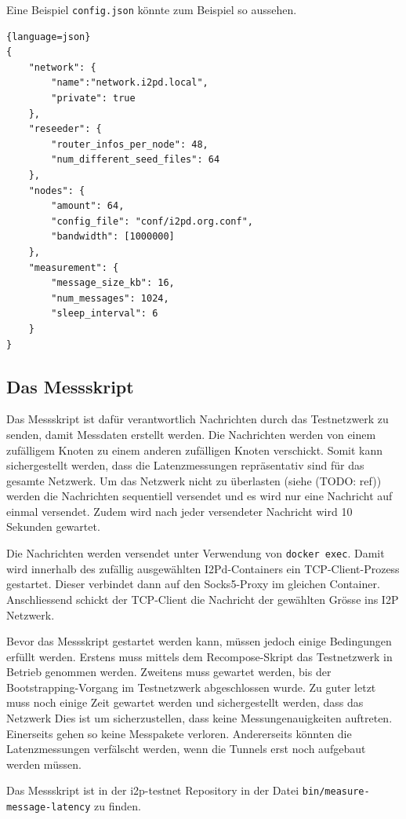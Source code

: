Eine Beispiel \lstinline|config.json| könnte zum Beispiel so aussehen.

\begin{lstlisting}{language=json}
{
    "network": {
        "name":"network.i2pd.local",
        "private": true
    },
    "reseeder": {
        "router_infos_per_node": 48,
        "num_different_seed_files": 64
    },
    "nodes": {
        "amount": 64,
        "config_file": "conf/i2pd.org.conf",
        "bandwidth": [1000000]
    },
    "measurement": {
        "message_size_kb": 16,
        "num_messages": 1024,
        "sleep_interval": 6
    }
}
\end{lstlisting}

\subsection{Das Messskript}\label{sec:messskript}

Das Messskript ist dafür verantwortlich Nachrichten durch das Testnetzwerk zu senden, damit Messdaten erstellt werden.
Die Nachrichten werden von einem zufälligem Knoten zu einem anderen zufälligen Knoten verschickt.
Somit kann sichergestellt werden, dass die Latenzmessungen repräsentativ sind für das gesamte Netzwerk.
Um das Netzwerk nicht zu überlasten (siehe (TODO: ref)) werden die Nachrichten sequentiell versendet und es wird nur eine Nachricht auf einmal versendet.
Zudem wird nach jeder versendeter Nachricht wird 10 Sekunden gewartet.

Die Nachrichten werden versendet unter Verwendung von \lstinline|docker exec|.
Damit wird innerhalb des zufällig ausgewählten I2Pd-Containers ein TCP-Client-Prozess gestartet.
Dieser verbindet dann auf den Socks5-Proxy im gleichen Container.
Anschliessend schickt der TCP-Client die Nachricht der gewählten Grösse ins I2P Netzwerk.

Bevor das Messskript gestartet werden kann, müssen jedoch einige Bedingungen erfüllt werden.
Erstens muss mittels dem Recompose-Skript das Testnetzwerk in Betrieb genommen werden.
Zweitens muss gewartet werden, bis der Bootstrapping-Vorgang im Testnetzwerk abgeschlossen wurde.
Zu guter letzt muss noch einige Zeit gewartet werden und sichergestellt werden, dass das Netzwerk 
Dies ist um sicherzustellen, dass keine Messungenauigkeiten auftreten.
Einerseits gehen so keine Messpakete verloren. Andererseits könnten die Latenzmessungen verfälscht werden, wenn die Tunnels erst noch aufgebaut werden müssen.

Das Messskript ist in der i2p-testnet Repository in der Datei \lstinline|bin/measure-message-latency| zu finden.


